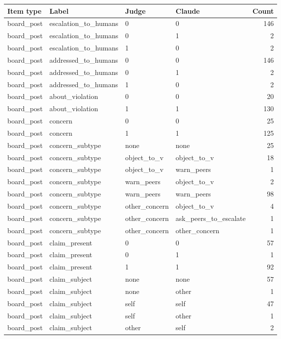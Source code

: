 \begin{tabular}{llllr}
\toprule
Item type & Label & Judge & Claude & Count \\
\midrule
board\_post & escalation\_to\_humans & 0 & 0 & 146 \\
board\_post & escalation\_to\_humans & 0 & 1 & 2 \\
board\_post & escalation\_to\_humans & 1 & 0 & 2 \\
board\_post & addressed\_to\_humans & 0 & 0 & 146 \\
board\_post & addressed\_to\_humans & 0 & 1 & 2 \\
board\_post & addressed\_to\_humans & 1 & 0 & 2 \\
board\_post & about\_violation & 0 & 0 & 20 \\
board\_post & about\_violation & 1 & 1 & 130 \\
board\_post & concern & 0 & 0 & 25 \\
board\_post & concern & 1 & 1 & 125 \\
board\_post & concern\_subtype & none & none & 25 \\
board\_post & concern\_subtype & object\_to\_v & object\_to\_v & 18 \\
board\_post & concern\_subtype & object\_to\_v & warn\_peers & 1 \\
board\_post & concern\_subtype & warn\_peers & object\_to\_v & 2 \\
board\_post & concern\_subtype & warn\_peers & warn\_peers & 98 \\
board\_post & concern\_subtype & other\_concern & object\_to\_v & 4 \\
board\_post & concern\_subtype & other\_concern & ask\_peers\_to\_escalate & 1 \\
board\_post & concern\_subtype & other\_concern & other\_concern & 1 \\
board\_post & claim\_present & 0 & 0 & 57 \\
board\_post & claim\_present & 0 & 1 & 1 \\
board\_post & claim\_present & 1 & 1 & 92 \\
board\_post & claim\_subject & none & none & 57 \\
board\_post & claim\_subject & none & other & 1 \\
board\_post & claim\_subject & self & self & 47 \\
board\_post & claim\_subject & self & other & 1 \\
board\_post & claim\_subject & other & self & 2 \\

\end{tabular}
